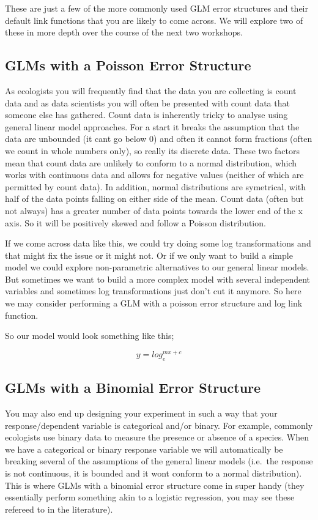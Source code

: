 \documentclass[
]{book}
\begin{document}
These are just a few of the more commonly used GLM error structures and their default link functions that you are likely to come across. We will explore two of these in more depth over the course of the next two workshops.

\subsection{GLMs with a Poisson Error Structure}\label{glms-with-a-poisson-error-structure}

As ecologists you will frequently find that the data you are collecting is count data and as data scientists you will often be presented with count data that someone else has gathered. Count data is inherently tricky to analyse using general linear model approaches. For a start it breaks the assumption that the data are unbounded (it cant go below 0) and often it cannot form fractions (often we count in whole numbers only), so really its discrete data. These two factors mean that count data are unlikely to conform to a normal distribution, which works with continuous data and allows for negative values (neither of which are permitted by count data). In addition, normal distributions are symetrical, with half of the data points falling on either side of the mean. Count data (often but not always) has a greater number of data points towards the lower end of the x axis. So it will be positively skewed and follow a Poisson distribution.

If we come across data like this, we could try doing some log transformations and that might fix the issue or it might not. Or if we only want to build a simple model we could explore non-parametric alternatives to our general linear models. But sometimes we want to build a more complex model with several independent variables and sometimes log transformations just don't cut it anymore. So here we may consider performing a GLM with a poisson error structure and log link function.

So our model would look something like this;

\[
y = log_e^{mx+c}
\]

\subsection{GLMs with a Binomial Error Structure}\label{glms-with-a-binomial-error-structure}

You may also end up designing your experiment in such a way that your response/dependent variable is categorical and/or binary. For example, commonly ecologists use binary data to measure the presence or absence of a species. When we have a categorical or binary response variable we will automatically be breaking several of the assumptions of the general linear models (i.e.~the response is not continuous, it is bounded and it wont conform to a normal distribution). This is where GLMs with a binomial error structure come in super handy (they essentially perform something akin to a logistic regression, you may see these refereed to in the literature).
\end{document}
